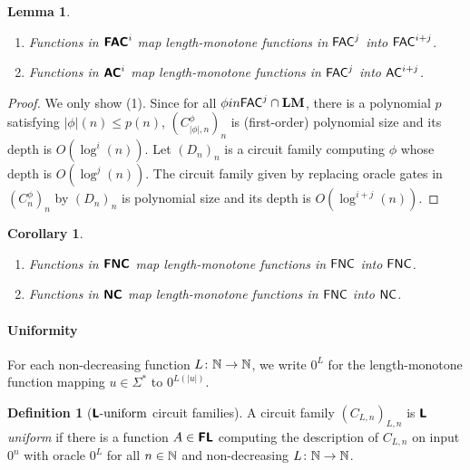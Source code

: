\documentclass{article}
\newtheorem{lemma}[theorem]{Lemma}
\newtheorem{corollary}[theorem]{Corollary}
\theoremstyle{definition}
\newtheorem{definition}[theorem]{Definition}
\theoremstyle{remark}
\begin{document}
\begin{lemma}
\label{lemma:NCtwo-maps-NC-to-NC}
\mbox{}
\begin{enumerate}
 \item Functions in $\text{\bfseries \sffamily \upshape FAC}^i$ map length-monotone functions in $\mathsf{FAC}^j$ into $\mathsf{FAC}^{i+j}$.
 \item Functions in $\text{\bfseries \sffamily \upshape AC}^i$ map length-monotone functions in $\mathsf{FAC}^j$ into $\mathsf{AC}^{i+j}$.
\end{enumerate}
\end{lemma}

\begin{proof}
We only show (1).
Since for all $\phi in \mathsf{FAC}^j \cap \mathbf{LM}$, there is a polynomial $p$ satisfying $|\phi|(n) \le p(n)$, 
$(C^\phi_{|\phi|,n})_n$ is (first-order) polynomial size and its depth is $O(\log^i(n))$.
Let $(D_n)_n$ is a circuit family computing $\phi$ whose depth is $O(\log^j(n))$.
The circuit family given by replacing oracle gates in $(C^\phi_n)_n$ by $(D_n)_n$ is polynomial size and its depth is $O(\log^{i+j}(n))$.
\end{proof}

\begin{corollary}
\mbox{}
\begin{enumerate}
 \item Functions in $\text{\bfseries \sffamily \upshape FNC}$ map length-monotone functions in $\mathsf{FNC}$ into $\mathsf{FNC}$.
 \item Functions in $\text{\bfseries \sffamily \upshape NC}$ map length-monotone functions in $\mathsf{FNC}$ into $\mathsf{NC}$.
\end{enumerate} 
\end{corollary}



\paragraph{Uniformity}


For each non-decreasing function $L \colon \mathbb N \to \mathbb N$, 
we write $0^L$ for the length-monotone function mapping 
$u \in \Sigma^*$ to $0^{L(|u|)}$.

\begin{definition}[$\text{\bfseries \sffamily \upshape L}\text{-uniform}$ circuit families]
A circuit family $(C_{L,n})_{L,n}$ is \emph{$\text{\bfseries \sffamily \upshape L}$ uniform} if there is a function $A \in \text{\bfseries \sffamily \upshape FL}$ computing the description of $C_{L,n}$ on input $0^n$ with oracle $0^L$ for all $n \in \mathbb N$ and non-decreasing $L \colon \mathbb N \to \mathbb N$.
\end{definition}
\end{document}
